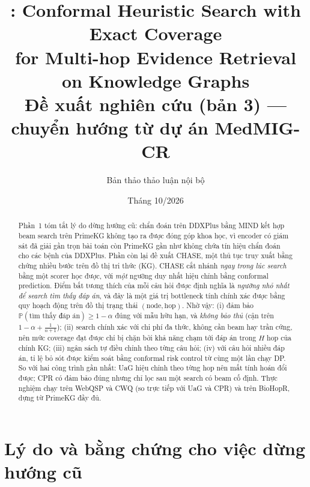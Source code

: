 \documentclass[11pt,a4paper]{article}
\title{\method: Conformal Heuristic Search with Exact Coverage\\
for Multi-hop Evidence Retrieval on Knowledge Graphs\\[4pt]
\large Đề xuất nghiên cứu (bản 3) --- chuyển hướng từ dự án MedMIG-CR}
\author{Bản thảo thảo luận nội bộ}
\date{Tháng 10/2026}
\theoremstyle{remark}
\newcommand{\Prob}{\mathbb{P}}
\newcommand{\method}{\textsc{CHASE}}
\begin{document}
\maketitle

\begin{abstract}
Phần~1 tóm tắt lý do dừng hướng cũ: chẩn đoán trên DDXPlus bằng MIND kết hợp beam search trên PrimeKG không tạo ra được đóng góp khoa học, vì encoder có giám sát đã giải gần trọn bài toán còn PrimeKG gần như không chứa tín hiệu chẩn đoán cho các bệnh của DDXPlus. Phần còn lại đề xuất \method{}, một thủ tục truy xuất bằng chứng nhiều bước trên đồ thị tri thức (KG). \method{} cắt nhánh \emph{ngay trong lúc search} bằng một scorer học được, với \emph{một} ngưỡng duy nhất hiệu chỉnh bằng conformal prediction. Điểm bất tương thích của mỗi câu hỏi được định nghĩa là \emph{ngưỡng nhỏ nhất để search tìm thấy đáp án}, và đây là một giá trị bottleneck tính chính xác được bằng quy hoạch động trên đồ thị trạng thái $(\text{node},\text{hop})$. Nhờ vậy: (i) đảm bảo $\Prob(\text{tìm thấy đáp án})\ge 1-\alpha$ đúng với mẫu hữu hạn, và \emph{không bảo thủ} (cận trên $1-\alpha+\tfrac{1}{n+1}$); (ii) search chính xác với chi phí đa thức, không cần beam hay trần cứng, nên mức coverage đạt được chỉ bị chặn bởi khả năng chạm tới đáp án trong $H$ hop của chính KG; (iii) ngân sách tự điều chỉnh theo từng câu hỏi; (iv) với câu hỏi nhiều đáp án, tỉ lệ bỏ sót được kiểm soát bằng conformal risk control từ cùng một lần chạy DP. So với hai công trình gần nhất: UaG hiệu chỉnh theo từng hop nên mất tính hoán đổi được; CPR có đảm bảo đúng nhưng chỉ lọc sau một search có beam cố định. Thực nghiệm chạy trên WebQSP và CWQ (so trực tiếp với UaG và CPR) và trên BioHopR, dựng từ PrimeKG đầy đủ.
\end{abstract}

\tableofcontents
\newpage

\section{Lý do và bằng chứng cho việc dừng hướng cũ}
\end{document}
